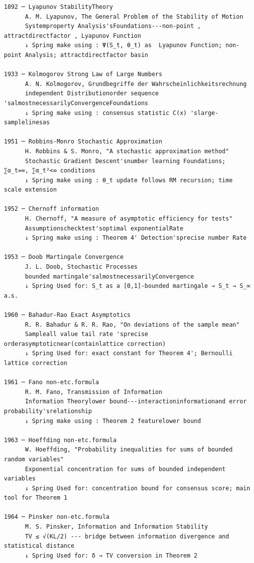 \documentclass[
  12pt,
]{article}
\begin{document}
\begin{verbatim}
1892 ─ Lyapunov StabilityTheory
      A. M. Lyapunov, The General Problem of the Stability of Motion
      Systemproperty Analysis'sFoundations---non-point , attractdirectfactor , Lyapunov Function
      ↓ Spring make using : Ψ(S_t, θ_t) as  Lyapunov Function; non-point Analysis; attractdirectfactor basin
      
1933 ─ Kolmogorov Strong Law of Large Numbers
      A. N. Kolmogorov, Grundbegriffe der Wahrscheinlichkeitsrechnung
      independent Distributionorder sequence 'salmostnecessarilyConvergenceFoundations
      ↓ Spring make using : consensus statistic C(x) 'slarge-samplelinesas 
      
1951 ─ Robbins-Monro Stochastic Approximation
      H. Robbins & S. Monro, "A stochastic approximation method"
      Stochastic Gradient Descent'snumber learning Foundations; ∑α_t=∞, ∑α_t²<∞ conditions
      ↓ Spring make using : θ_t update follows RM recursion; time scale extension
      
1952 ─ Chernoff information
      H. Chernoff, "A measure of asymptotic efficiency for tests"
      Assumptionschecktest'soptimal exponentialRate
      ↓ Spring make using : Theorem 4' Detection'sprecise number Rate

1953 ─ Doob Martingale Convergence
      J. L. Doob, Stochastic Processes
      bounded martingale'salmostnecessarilyConvergence
      ↓ Spring Used for: S_t as a [0,1]-bounded martingale → S_t → S_∞ a.s.

1960 ─ Bahadur-Rao Exact Asymptotics
      R. R. Bahadur & R. R. Rao, "On deviations of the sample mean"
      Sampleall value tail rate 'sprecise orderasymptoticnear(containlattice correction)
      ↓ Spring Used for: exact constant for Theorem 4'; Bernoulli lattice correction
      
1961 ─ Fano non-etc.formula 
      R. M. Fano, Transmission of Information
      Information Theorylower bound---interactioninformationand error probability'srelationship 
      ↓ Spring make using : Theorem 2 featurelower bound
      
1963 ─ Hoeffding non-etc.formula 
      W. Hoeffding, "Probability inequalities for sums of bounded random variables"
      Exponential concentration for sums of bounded independent variables
      ↓ Spring Used for: concentration bound for consensus score; main tool for Theorem 1
      
1964 ─ Pinsker non-etc.formula 
      M. S. Pinsker, Information and Information Stability
      TV ≤ √(KL/2) --- bridge between information divergence and statistical distance
      ↓ Spring Used for: δ → TV conversion in Theorem 2
      

\end{verbatim}
\end{document}
